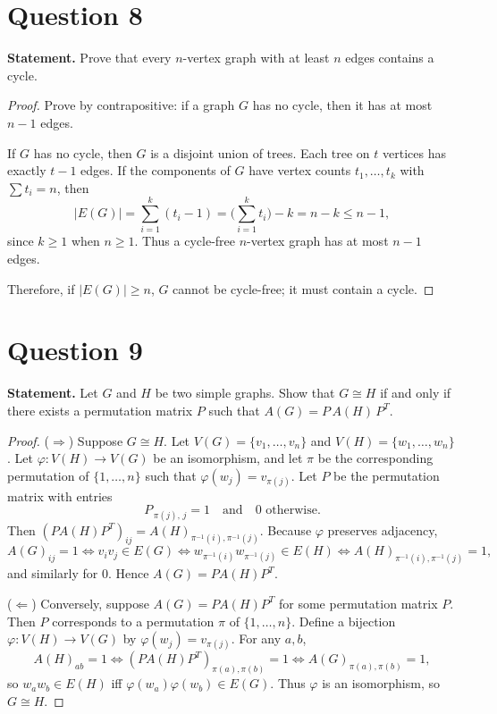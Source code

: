 \documentclass[11pt]{article}
\begin{document}
\newpage

\section*{Question 8}
\textbf{Statement.} Prove that every $n$-vertex graph with at least $n$ edges contains a cycle.

\begin{proof}
Prove by contrapositive: if a graph $G$ has no cycle, then it has at most $n-1$ edges.

If $G$ has no cycle, then $G$ is a  disjoint union of trees.
Each tree on $t$ vertices has exactly $t-1$ edges.
If the components of $G$ have vertex counts $t_1,\dots,t_k$ with $\sum t_i=n$, then
\[
|E(G)|=\sum_{i=1}^k (t_i-1)=\Big(\sum_{i=1}^k t_i\Big)-k = n-k \le n-1,
\]
since $k\ge 1$ when $n\ge 1$.
Thus a cycle-free $n$-vertex graph has at most $n-1$ edges.

Therefore, if $|E(G)|\ge n$, $G$ cannot be cycle-free; it must contain a cycle.
\end{proof}

\newpage

\section*{Question 9}
\textbf{Statement.} Let $G$ and $H$ be two simple graphs. Show that $G \cong H$ if and only if there exists a permutation matrix $P$ such that $A(G)=P\,A(H)\,P^{T}$.

\begin{proof}
($\Rightarrow$) Suppose $G\cong H$.
Let $V(G)=\{v_1,\dots,v_n\}$ and $V(H)=\{w_1,\dots,w_n\}$.
Let $\varphi:V(H)\to V(G)$ be an isomorphism, and let $\pi$ be the corresponding permutation of $\{1,\dots,n\}$ such that $\varphi(w_j)=v_{\pi(j)}$.
Let $P$ be the permutation matrix with entries
\[
P_{\,\pi(j),\,j}=1 \quad\text{and}\quad 0 \text{ otherwise.}
\]
Then $(P A(H) P^T)_{ij} = A(H)_{\pi^{-1}(i),\pi^{-1}(j)}$.
Because $\varphi$ preserves adjacency,
\[
A(G)_{ij}=1 \iff v_i v_j\in E(G)
\iff w_{\pi^{-1}(i)} w_{\pi^{-1}(j)}\in E(H)
\iff A(H)_{\pi^{-1}(i),\pi^{-1}(j)}=1,
\]
and similarly for $0$. Hence $A(G)=P A(H) P^T$.

($\Leftarrow$) Conversely, suppose $A(G)=P A(H) P^T$ for some permutation matrix $P$.
Then $P$ corresponds to a permutation $\pi$ of $\{1,\dots,n\}$.
Define a bijection $\varphi:V(H)\to V(G)$ by $\varphi(w_j)=v_{\pi(j)}$.
For any $a,b$,
\[
A(H)_{ab}=1 \iff (P A(H) P^T)_{\pi(a),\pi(b)}=1 \iff A(G)_{\pi(a),\pi(b)}=1,
\]
so $w_a w_b\in E(H)$ iff $\varphi(w_a)\varphi(w_b)\in E(G)$.
Thus $\varphi$ is an isomorphism, so $G\cong H$.
\end{proof}
\end{document}
